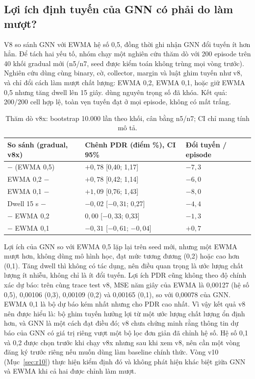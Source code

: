\subsection{Lợi ích định tuyến của GNN có phải do làm mượt?}
V8 so sánh GNN với EWMA hệ số 0,5, đồng thời ghi nhận GNN đổi tuyến ít hơn hẳn. Để tách hai yếu tố, nhóm chạy một nghiên cứu thăm dò  với 200 episode trên 40 khối gradual mới (n5/n7, seed được kiểm toán không trùng mọi vòng trước). Nghiên cứu dùng cùng binary, cờ, collector, margin và luật ghim tuyến như v8, và chỉ đổi cách làm mượt chất lượng: EWMA 0,2, EWMA 0,1, hoặc giữ EWMA 0,5 nhưng tăng dwell lên 15 giây.  dùng nguyên trọng số đã khóa. Kết quả: 200/200 cell hợp lệ, toàn vẹn tuyến đạt ở mọi episode, không có mất trắng.
\begin{table}[H]
\centering\small
\begin{tabularx}{\linewidth}{@{}YR{4.0cm}R{2.2cm}@{}}
\toprule\textbf{So sánh (gradual, v8x)}&\textbf{Chênh PDR (điểm \%), CI 95\%}&\textbf{Đổi tuyến / episode}\\\midrule
{} $-$  (EWMA 0,5)&$+0{,}78$ [0,40; 1,17]&$-7{,}3$\\
EWMA 0,2 $-$ &$+0{,}78$ [0,42; 1,14]&$-6{,}0$\\
EWMA 0,1 $-$ &$+1{,}09$ [0,76; 1,43]&$-8{,}0$\\
Dwell 15 s $-$ &$-0{,}02$ [$-0{,}31$; 0,27]&$-4{,}4$\\
 $-$ EWMA 0,2&$0{,}00$ [$-0{,}33$; 0,33]&$-1{,}3$\\
 $-$ EWMA 0,1&$-0{,}31$ [$-0{,}61$; $-0{,}04$]&$+0{,}7$\\\bottomrule
\end{tabularx}
\caption{Thăm dò v8x: bootstrap 10.000 lần theo khối, cân bằng n5/n7; CI chỉ mang tính mô tả.}\label{tab:posthoc-smooth}
\end{table}
Lợi ích của GNN so với EWMA 0,5 lặp lại trên seed mới, nhưng một EWMA mượt hơn, không dùng mô hình học, đạt mức tương đương (0,2) hoặc cao hơn (0,1). Tăng dwell thì không có tác dụng, nên điều quan trọng là ước lượng chất lượng ít nhiễu, không chỉ là ít đổi tuyến. Lợi ích PDR cũng không theo độ chính xác dự báo: trên cùng trace test v8, MSE năm giây của EWMA là 0,00127 (hệ số 0,5), 0,00106 (0,3), 0,00109 (0,2) và 0,00165 (0,1), so với 0,00078 của GNN. EWMA 0,1 là bộ dự báo kém nhất nhưng cho PDR cao nhất. Vì vậy kết quả v8 nên được hiểu là: bộ ghim tuyến hưởng lợi từ một ước lượng chất lượng ổn định hơn, và GNN là một cách đạt điều đó; v8 chưa chứng minh rằng thông tin dự báo của GNN có giá trị riêng vượt một bộ lọc đơn giản đã chỉnh hệ số. Hệ số 0,1 và 0,2 được chọn trước khi chạy v8x nhưng sau khi xem v8, nên cần một vòng đăng ký trước riêng nếu muốn dùng làm baseline chính thức. Vòng v10 (Mục~\ref{sec:r10}) thực hiện kiểm định đó và không phát hiện khác biệt giữa GNN và EWMA khi cả hai được chỉnh làm mượt.

